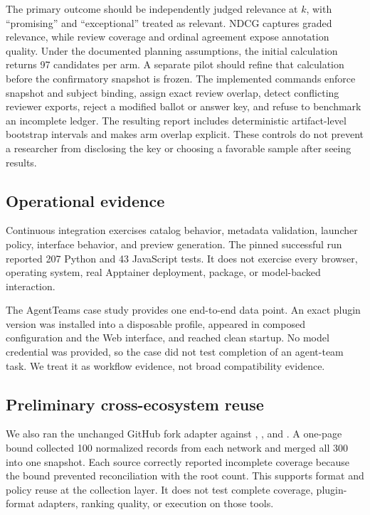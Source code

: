 \documentclass[10pt,twocolumn]{article}
\begin{document}
The primary outcome should be independently judged relevance at $k$, with ``promising'' and ``exceptional'' treated as relevant. NDCG captures graded relevance, while review coverage and ordinal agreement expose annotation quality. Under the documented planning assumptions, the initial calculation returns 97 candidates per arm. A separate pilot should refine that calculation before the confirmatory snapshot is frozen. The implemented commands enforce snapshot and subject binding, assign exact review overlap, detect conflicting reviewer exports, reject a modified ballot or answer key, and refuse to benchmark an incomplete ledger. The resulting report includes deterministic artifact-level bootstrap intervals and makes arm overlap explicit. These controls do not prevent a researcher from disclosing the key or choosing a favorable sample after seeing results.\cite{studyprotocol}

\subsection{Operational evidence}

Continuous integration exercises catalog behavior, metadata validation, launcher policy, interface behavior, and preview generation. The pinned successful run reported 207 Python and 43 JavaScript tests. It does not exercise every browser, operating system, real Apptainer deployment, package, or model-backed interaction.\cite{ci,catalogci}

The AgentTeams case study provides one end-to-end data point. An exact plugin version was installed into a disposable profile, appeared in composed configuration and the Web interface, and reached clean startup. No model credential was provided, so the case did not test completion of an agent-team task. We treat it as workflow evidence, not broad compatibility evidence.\cite{agentteams}

\subsection{Preliminary cross-ecosystem reuse}

We also ran the unchanged GitHub fork adapter against , , and . A one-page bound collected 100 normalized records from each network and merged all 300 into one snapshot. Each source correctly reported incomplete coverage because the bound prevented reconciliation with the root count. This supports format and policy reuse at the collection layer. It does not test complete coverage, plugin-format adapters, ranking quality, or execution on those tools.\cite{crossvalidation}
\end{document}
